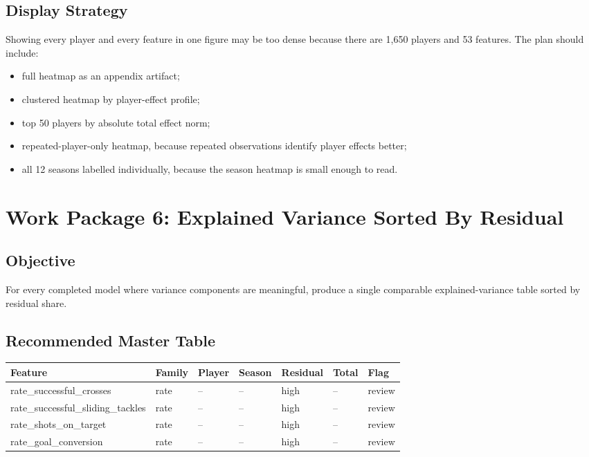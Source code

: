 \documentclass[11pt]{article}
\begin{document}
\subsection{Display Strategy}

Showing every player and every feature in one figure may be too dense because
there are 1,650 players and 53 features. The plan should include:

\begin{itemize}[leftmargin=*]
  \item full heatmap as an appendix artifact;
  \item clustered heatmap by player-effect profile;
  \item top 50 players by absolute total effect norm;
  \item repeated-player-only heatmap, because repeated observations identify
  player effects better;
  \item all 12 seasons labelled individually, because the season heatmap is
  small enough to read.
\end{itemize}

\section{Work Package 6: Explained Variance Sorted By Residual}

\subsection{Objective}

For every completed model where variance components are meaningful, produce a
single comparable explained-variance table sorted by residual share.

\subsection{Recommended Master Table}

\begin{longtable}{L{0.27\textwidth}L{0.10\textwidth}R{0.08\textwidth}R{0.08\textwidth}R{0.10\textwidth}R{0.07\textwidth}L{0.09\textwidth}}
\toprule
Feature & Family & Player & Season & Residual & Total & Flag \\
\midrule
\endhead
\small rate\_successful\_crosses & rate & -- & -- & high & -- & review \\
\small rate\_successful\_sliding\newline \small \_tackles & rate & -- & -- & high & -- & review \\
\small rate\_shots\_on\_target & rate & -- & -- & high & -- & review \\
\small rate\_goal\_conversion & rate & -- & -- & high & -- & review \\
\bottomrule
\end{longtable}
\end{document}
